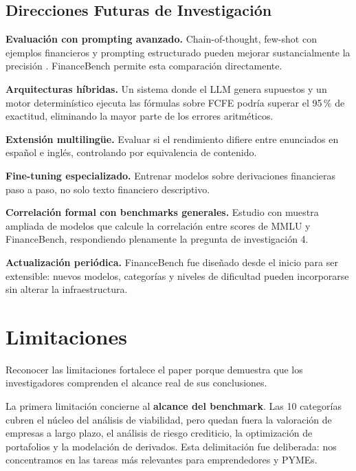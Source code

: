 \documentclass[12pt,a4paper]{article}
\begin{document}
\subsection{Direcciones Futuras de Investigación}

\textbf{Evaluación con prompting avanzado.} Chain-of-thought, few-shot con ejemplos financieros y prompting estructurado pueden mejorar sustancialmente la precisión \citep{Wei2022,Sahoo2024}. FinanceBench permite esta comparación directamente.

\textbf{Arquitecturas híbridas.} Un sistema donde el LLM genera supuestos y un motor determinístico ejecuta las fórmulas sobre FCFE podría superar el 95\,\% de exactitud, eliminando la mayor parte de los errores aritméticos.

\textbf{Extensión multilingüe.} Evaluar si el rendimiento difiere entre enunciados en español e inglés, controlando por equivalencia de contenido.

\textbf{Fine-tuning especializado.} Entrenar modelos sobre derivaciones financieras paso a paso, no solo texto financiero descriptivo.

\textbf{Correlación formal con benchmarks generales.} Estudio con muestra ampliada de modelos que calcule la correlación entre scores de MMLU y FinanceBench, respondiendo plenamente la pregunta de investigación 4.

\textbf{Actualización periódica.} FinanceBench fue diseñado desde el inicio para ser extensible: nuevos modelos, categorías y niveles de dificultad pueden incorporarse sin alterar la infraestructura.

\section{Limitaciones}\label{sec:limitaciones}

Reconocer las limitaciones fortalece el paper porque demuestra que los investigadores comprenden el alcance real de sus conclusiones.

La primera limitación concierne al \textbf{alcance del benchmark}. Las 10 categorías cubren el núcleo del análisis de viabilidad, pero quedan fuera la valoración de empresas a largo plazo, el análisis de riesgo crediticio, la optimización de portafolios y la modelación de derivados. Esta delimitación fue deliberada: nos concentramos en las tareas más relevantes para emprendedores y PYMEs.
\end{document}
